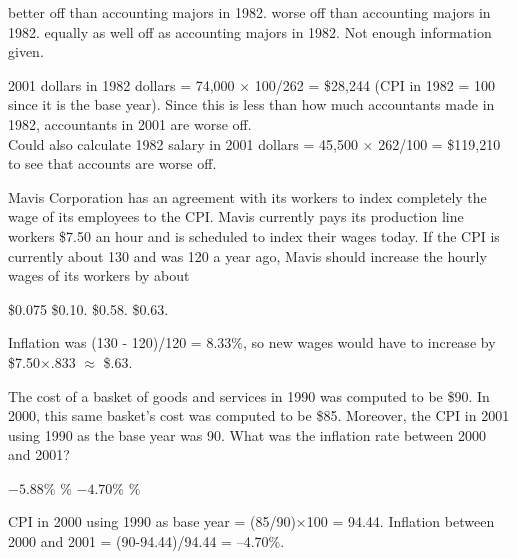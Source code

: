 \documentclass[addpoints,11pt]{exam}
\theoremstyle{definition}
\begin{document}
\begin{questions}
			\begin{choices}
				\choice better off than accounting majors in 1982.
				\CorrectChoice worse off than accounting majors in 1982.
				\choice equally as well off as accounting majors in 1982.
				\choice Not enough information given.
			\end{choices}
			
			\begin{solution}
				2001 dollars in 1982 dollars = 74,000 $\times$ 100/262 = \$28,244 (CPI in 1982 = 100 since it is the base year). Since this is less than how much accountants made in 1982, accountants in 2001 are worse off. \\
				Could also calculate 1982 salary in 2001 dollars = 45,500 $\times$ 262/100 = \$119,210 to see that accounts are worse off.
			\end{solution}
		
			\question Mavis Corporation has an agreement with its workers to index completely the wage of its employees to the CPI. Mavis currently pays its production line workers \$7.50 an hour and is scheduled to index their wages today. If the CPI is currently about 130 and was 120 a year ago, Mavis should increase the hourly wages of its workers by about
			
			\begin{choices}
				\choice \$0.075
				\choice  \$0.10.
				\choice \$0.58.
				\CorrectChoice \$0.63.
			\end{choices}
			
			\begin{solution}
				Inflation was (130 - 120)/120 = 8.33\%, so new wages would have to increase by \$7.50$\times$.833 $\approx$ \$.63.
			\end{solution}
			
			
			\question The cost of a basket of goods and services in 1990 was computed to be \$90. In 2000, this same basket's cost was computed to be \$85. Moreover, the CPI in 2001 using 1990 as the base year was 90. What was the inflation rate between 2000 and 2001?
			
			\begin{choices}
				\choice $-5.88\%$
				\choice 4.70\%
				\CorrectChoice $-4.70\%$
				\choice 5.88\%
			\end{choices}
			
			\begin{solution}
				CPI in 2000 using 1990 as base year = (85/90)$\times$100 = 94.44. Inflation between 2000 and 2001 = (90-94.44)/94.44 = --4.70\%.
			\end{solution}


\end{questions}
\end{document}
